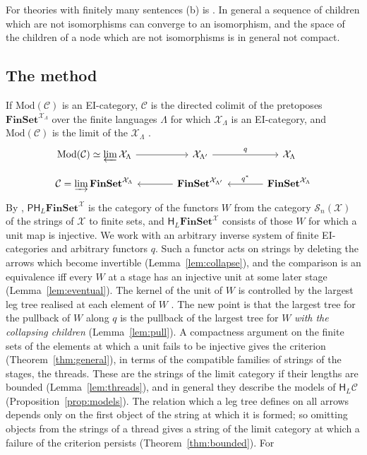 \documentclass[11pt]{amsart}
\theoremstyle{definition}
\newcommand{\Fin}{\mathbf{FinSet}}
\newcommand{\Mod}{\mathrm{Mod}}
\newcommand{\PP}{\mathsf P}
\newcommand{\HH}{\mathsf H}
\newcommand{\cX}{\mathcal X}
\newcommand{\cC}{\mathcal C}
\newcommand{\cS}{\mathcal S}
\begin{document}
For theories with finitely many sentences (b) is
\cite[Prop.~8.3]{Proftrees}. In general a sequence of children which
are not isomorphisms can converge to an isomorphism, and the space of
the children of a node which are not isomorphisms is in general not
compact.

\subsection*{The method}
If $\Mod(\cC)$ is an EI-category, $\cC$ is the directed colimit of the
pretoposes $\Fin^{\cX_\Lambda}$ over the finite languages $\Lambda$
for which $\cX_\Lambda$ is an EI-category, and $\Mod(\cC)$ is the
limit of the $\cX_\Lambda$ \cite{Finsorts}.
\[
\begin{tikzcd}[column sep=large,row sep=small]
\Mod(\cC)\simeq\varprojlim\cX_\Lambda\ar[r]&\cX_{\Lambda'}\ar[r,"q"]&
\cX_\Lambda\\
\cC=\varinjlim\Fin^{\cX_\Lambda}&\Fin^{\cX_{\Lambda'}}\ar[l]&
\Fin^{\cX_\Lambda}\ar[l,"q^*"']
\end{tikzcd}
\]
By \cite{Strings}, $\PP\HH_L\Fin^{\cX}$ is the category of the functors
$W$ from the category $\cS_n(\cX)$ of the strings of $\cX$ to finite
sets, and $\HH_L\Fin^\cX$ consists of those $W$ for which a unit map
is injective. We work with an arbitrary inverse system of finite
EI-categories and arbitrary functors $q$. Such a functor acts on
strings by deleting the arrows which become invertible
(Lemma~\ref{lem:collapse}), and the comparison is an equivalence iff
every $W$ at a stage has an injective unit at some later stage
(Lemma~\ref{lem:eventual}). The kernel of the unit of $W$ is
controlled by the largest leg tree realised at each element of $W$
\cite{Proftrees}. The new point is that the largest tree for the
pullback of $W$ along $q$ is the pullback of the largest tree for $W$
\emph{with the collapsing children} (Lemma~\ref{lem:pull}). A
compactness argument on the finite sets of the elements at which a
unit fails to be injective gives the criterion
(Theorem~\ref{thm:general}), in terms of the compatible families of
strings of the stages, the threads. These are the strings of the limit
category if their lengths are bounded (Lemma~\ref{lem:threads}), and
in general they describe the models of $\HH_L\cC$
(Proposition~\ref{prop:models}). The relation which a leg tree
defines on all arrows depends only on the first object of the string
at which it is formed; so omitting objects from the strings of a
thread gives a string of the limit category at which a failure of the
criterion persists (Theorem~\ref{thm:bounded}). For
\end{document}
